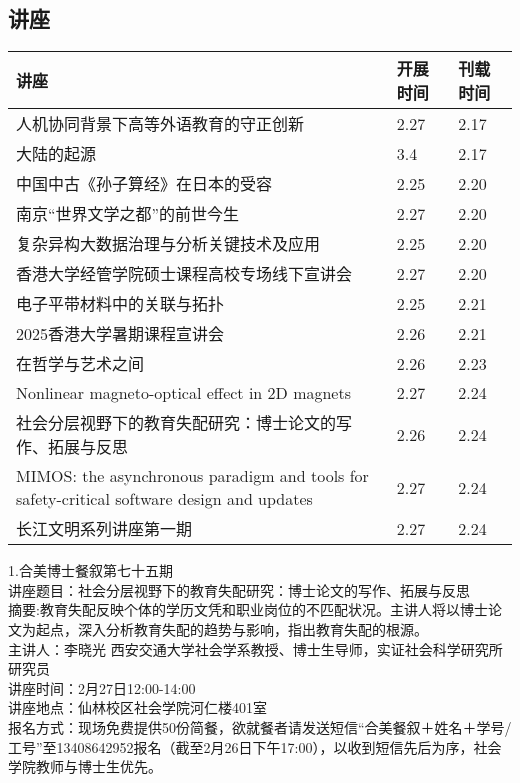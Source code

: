 \documentclass[letterpaper, 12pt]{article}
\begin{document}
\begin{multicols}{2}

\section{讲座}
\begin{tabular}{|>{\centering\arraybackslash}m{}|m{}|m{}|}
    \hline
    讲座 & 开展时间 & 刊载时间\\
    \hline\hline

  人机协同背景下高等外语教育的守正创新 & 2.27 & 2.17\\\hline
    大陆的起源 & 3.4 & 2.17\\\hline
    中国中古《孙子算经》在日本的受容 & 2.25 & 2.20\\\hline
    南京“世界文学之都”的前世今生 & 2.27 & 2.20\\\hline
    复杂异构大数据治理与分析关键技术及应用 & 2.25 & 2.20\\\hline
    香港大学经管学院硕士课程高校专场线下宣讲会 & 2.27 & 2.20\\\hline
    电子平带材料中的关联与拓扑 & 2.25 & 2.21\\\hline
    2025香港大学暑期课程宣讲会 & 2.26 & 2.21\\\hline
    在哲学与艺术之间 & 2.26 & 2.23\\\hline
    Nonlinear magneto-optical effect in 2D magnets & 2.27&2.24\\\hline
    社会分层视野下的教育失配研究：博士论文的写作、拓展与反思 & 2.26 & 2.24\\\hline
    MIMOS: the asynchronous paradigm and tools for safety-critical software design and updates & 2.27 & 2.24\\\hline
    长江文明系列讲座第一期 & 2.27 & 2.24\\\hline
    \hline
\end{tabular}
1.合美博士餐叙第七十五期\\
讲座题目：社会分层视野下的教育失配研究：博士论文的写作、拓展与反思\\
摘要:教育失配反映个体的学历文凭和职业岗位的不匹配状况。主讲人将以博士论文为起点，深入分析教育失配的趋势与影响，指出教育失配的根源。\\
主讲人：李晓光 西安交通大学社会学系教授、博士生导师，实证社会科学研究所研究员\\
讲座时间：2月27日12:00-14:00\\
讲座地点：仙林校区社会学院河仁楼401室\\
报名方式：现场免费提供50份简餐，欲就餐者请发送短信“合美餐叙＋姓名＋学号/工号”至13408642952报名（截至2月26日下午17:00），以收到短信先后为序，社会学院教师与博士生优先。\\



\end{multicols}
\end{document}

